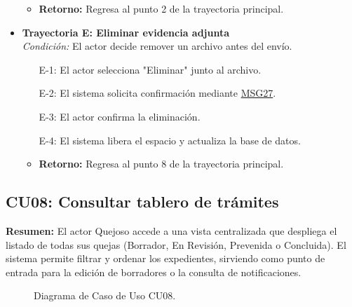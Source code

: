 \begin{appendices}
\begin{itemize}[leftmargin=*]
\begin{itemize}[nosep]
        \item \textbf{Retorno:} Regresa al punto 2 de la trayectoria principal.
    \end{itemize}
    \item \textbf{Trayectoria E: Eliminar evidencia adjunta} \\
    \textit{Condición:} El actor decide remover un archivo antes del envío.
    \begin{itemize}[nosep]
        \item[E-1:] El actor selecciona "Eliminar" junto al archivo.
        \item[E-2:] El sistema solicita confirmación mediante \hyperlink{msg:MSG27}{MSG27}.
        \item[E-3:] El actor confirma la eliminación.
        \item[E-4:] El sistema libera el espacio y actualiza la base de datos.
        \item \textbf{Retorno:} Regresa al punto 8 de la trayectoria principal.
    \end{itemize}
\end{itemize}

\newpage

\subsection{CU08: Consultar tablero de trámites}

\textbf{Resumen:} 
El actor Quejoso accede a una vista centralizada que despliega el listado de todas sus quejas (Borrador, En Revisión, Prevenida o Concluida). El sistema permite filtrar y ordenar los expedientes, sirviendo como punto de entrada para la edición de borradores o la consulta de notificaciones.

\begin{figure}[htbp]
    \centering
    \figCUocho
    \caption{Diagrama de Caso de Uso CU08.}
    \label{fig:cu08}
\end{figure}


\end{appendices}
